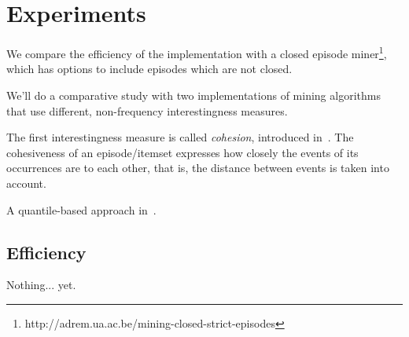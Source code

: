 \chapter{Experiments}
\label{sec:experiments}

We compare the efficiency of the implementation with a closed episode miner\footnote{http://adrem.ua.ac.be/mining-closed-strict-episodes}, which has options to include episodes which are not closed.

We'll do a comparative study with two implementations of mining algorithms that use different, non-frequency interestingness measures.

The first interestingness measure is called \emph{cohesion}, introduced in~\citep{cule2016efficient}. The cohesiveness of an episode/itemset expresses how closely the events of its occurrences are to each other, that is, the distance between events is taken into account.

A quantile-based approach in~\citep{feremans2018mining}.

\section{Efficiency}

Nothing... yet.
